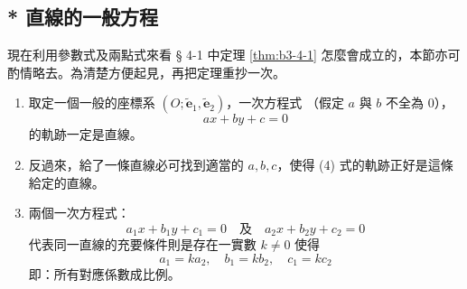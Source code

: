 \subsection{* 直線的一般方程}
\label{sec:4-3}

現在利用參數式及兩點式來看 § 4-1 中定理 \ref{thm:b3-4-1} 怎麼會成立的，本節亦可酌情略去。為清楚方便起見，再把定理重抄一次。

\begin{theorem*}[定理 1 重述]
\begin{enumerate}[label=(\Roman*), leftmargin=2em]
  \item 取定一個一般的座標系 $(O; \tilde{\mathbf{e}}_1, \tilde{\mathbf{e}}_2)$，一次方程式
  （假定 $a$ 與 $b$ 不全為 0），
  \begin{equation}
  ax + by + c = 0
  \tag{4}
  \end{equation}
  的軌跡一定是直線。
  \item 反過來，給了一條直線必可找到適當的 $a, b, c$，使得 (4) 式的軌跡正好是這條給定的直線。
  \item 兩個一次方程式：
  \[ a_1 x + b_1 y + c_1 = 0 \quad\text{及}\quad a_2 x + b_2 y + c_2 = 0 \]
  代表同一直線的充要條件則是存在一實數 $k \neq 0$ 使得
  \[ a_1 = k a_2, \quad b_1 = k b_2, \quad c_1 = k c_2 \]
  即：所有對應係數成比例。
\end{enumerate}
\end{theorem*}

